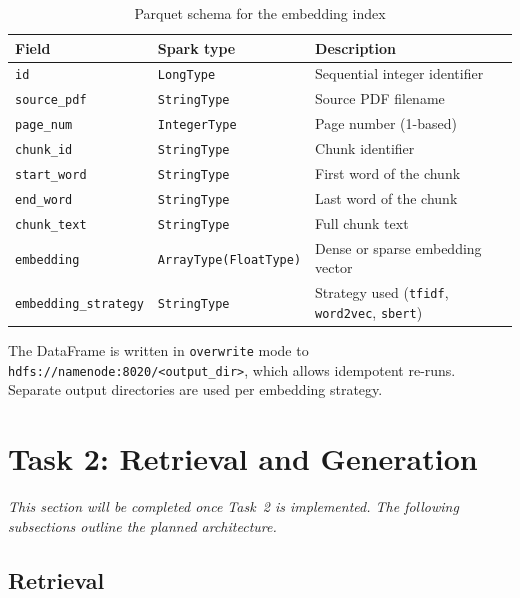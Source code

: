 \documentclass[a4paper,11pt]{article}
\begin{document}
\begin{table}[H]
  \centering
  \caption{Parquet schema for the embedding index}
  \begin{tabularx}{\linewidth}{llX}
    \toprule
    \textbf{Field} & \textbf{Spark type} & \textbf{Description} \\
    \midrule
    \texttt{id}                 & \texttt{LongType}              & Sequential integer identifier \\
    \texttt{source\_pdf}        & \texttt{StringType}            & Source PDF filename \\
    \texttt{page\_num}          & \texttt{IntegerType}           & Page number (1-based) \\
    \texttt{chunk\_id}          & \texttt{StringType}            & Chunk identifier \\
    \texttt{start\_word}        & \texttt{StringType}            & First word of the chunk \\
    \texttt{end\_word}          & \texttt{StringType}            & Last word of the chunk \\
    \texttt{chunk\_text}        & \texttt{StringType}            & Full chunk text \\
    \texttt{embedding}          & \texttt{ArrayType(FloatType)}  & Dense or sparse embedding vector \\
    \texttt{embedding\_strategy}& \texttt{StringType}            & Strategy used (\texttt{tfidf}, \texttt{word2vec}, \texttt{sbert}) \\
    \bottomrule
  \end{tabularx}
\end{table}

The DataFrame is written in \texttt{overwrite} mode to
\texttt{hdfs://namenode:8020/<output\_dir>}, which allows idempotent
re-runs. Separate output directories are used per embedding strategy.

\section{Task 2: Retrieval and Generation}
\label{sec:task2}

\textit{This section will be completed once Task~2 is implemented.
The following subsections outline the planned architecture.}

\subsection{Retrieval}
\end{document}
